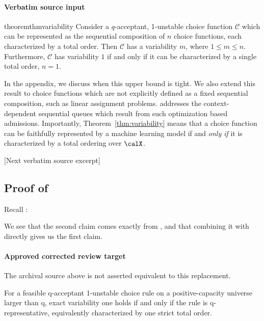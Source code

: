 \documentclass[10pt]{article}
\begin{document}
\paragraph{Verbatim source input}
\begin{ReviewVerbatim}
\begin{restatable}{theorem}{thmvariability}
\label{thm:variability}
Consider a $q$-acceptant, 1-unstable choice function $\mathcal C$ which
can be represented as the sequential composition of $n$ choice functions, each characterized by a total order.
Then $\mathcal C$ has a variability  $m$, where $1 \leq m \leq n$. Furthermore, $\mathcal C$ has variability $1$ if and only if it can be characterized by a single total order, $n=1$.
\end{restatable}
In the appendix, we discuss when this upper bound is tight. We also extend this result to choice functions which are not explicitly defined as a fixed sequential composition, such as linear assignment problems.
 addresses the context-dependent sequential queues which result from such optimization based admissions.
Importantly, Theorem~\ref{thm:variability} means that a choice function can be faithfully represented by a machine learning model if and \emph{only if} it is characterized by a total ordering over $\calX$.

[Next verbatim source excerpt]

\subsection{Proof of } \label{sec:variability-proof}

Recall :
\thmvariability*

We see that the second claim comes exactly from , and that combining it with  directly gives us the first claim.
\end{ReviewVerbatim}

\paragraph{Approved corrected review target}
The archival source above is not asserted equivalent to this replacement.
\begin{ReviewVerbatim}
For a feasible q-acceptant 1-unstable choice rule on a positive-capacity universe larger than q, exact variability one holds if and only if the rule is q-representative, equivalently characterized by one strict total order.
\end{ReviewVerbatim}
\end{document}
